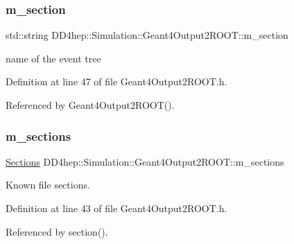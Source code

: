 \subsubsection{\texorpdfstring{m\+\_\+section}{m\_section}}
{\footnotesize\ttfamily std\+::string D\+D4hep\+::\+Simulation\+::\+Geant4\+Output2\+R\+O\+O\+T\+::m\+\_\+section\hspace{0.3cm}{\ttfamily [protected]}}



name of the event tree 



Definition at line 47 of file Geant4\+Output2\+R\+O\+O\+T.\+h.



Referenced by Geant4\+Output2\+R\+O\+O\+T().

\hypertarget{class_d_d4hep_1_1_simulation_1_1_geant4_output2_r_o_o_t_a43291c7d4f16e1f7eda8da9a16d6c4fa}{}\label{class_d_d4hep_1_1_simulation_1_1_geant4_output2_r_o_o_t_a43291c7d4f16e1f7eda8da9a16d6c4fa} 
\subsubsection{\texorpdfstring{m\+\_\+sections}{m\_sections}}
{\footnotesize\ttfamily \hyperlink{class_d_d4hep_1_1_simulation_1_1_geant4_output2_r_o_o_t_a6bee4e4ece80aae4e2e07295486f8cd0}{Sections} D\+D4hep\+::\+Simulation\+::\+Geant4\+Output2\+R\+O\+O\+T\+::m\+\_\+sections\hspace{0.3cm}{\ttfamily [protected]}}



Known file sections. 



Definition at line 43 of file Geant4\+Output2\+R\+O\+O\+T.\+h.



Referenced by section().

\hypertarget{class_d_d4hep_1_1_simulation_1_1_geant4_output2_r_o_o_t_abebdae30096c1b1a5ff1f7da427db295}{}\label{class_d_d4hep_1_1_simulation_1_1_geant4_output2_r_o_o_t_abebdae30096c1b1a5ff1f7da427db295} 
